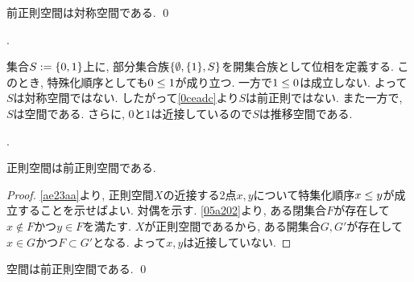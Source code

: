 \documentclass[uplatex, dvipdfmx, a4paper, 12pt, class=jsbook, crop=false]{standalone}
\begin{document}
\begin{proposition}
	\label{0ceadc}
	前正則空間は対称空間である.
	\qed
\end{proposition}

\begin{example}[\Sierpinski 空間]
	\WIP.

	集合\(S \defeq \lrbrace{0, 1}\)上に,
	部分集合族\(\lrbrace{\emptyset, \lrbrace{1}, S}\)を開集合族として位相を定義する.
	このとき, 特殊化順序としても\(0 \leq 1\)が成り立つ.
	一方で\(1 \leq 0\)は成立しない.
	よって\(S\)は対称空間ではない.
	したがって\cref{0ceadc}より\(S\)は前正則ではない.
	また一方で, \(S\)は空間である.
	さらに, \(0\)と\(1\)は近接しているので\(S\)は推移空間である.
\end{example}

\begin{example}[推移空間かつ対称空間であるが前正則ではない空間]
	\WIP.
\end{example}

\begin{proposition}
	正則空間は前正則空間である.
\end{proposition}

\begin{proof}
	\cref{ae23aa}より,
	正則空間\(X\)の近接する2点\(x, y\)について特集化順序\(x \leq y\)が成立することを示せばよい.
	対偶を示す.
	\cref{05a202}より,
	ある閉集合\(F\)が存在して\(x \not\in F\)かつ\(y \in F\)を満たす.
	\(X\)が正則空間であるから,
	ある開集合\(G, G'\)が存在して\(x \in G\)かつ\(F \subset G'\)となる.
	よって\(x, y\)は近接していない.
\end{proof}

\begin{proposition}
	\Hausdorff 空間は前正則空間である.
	\qed
\end{proposition}
\end{document}
